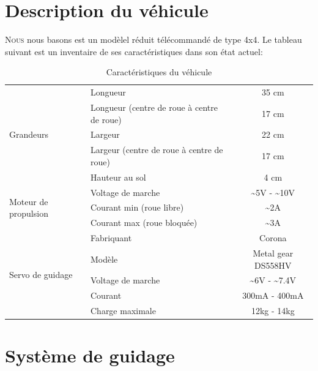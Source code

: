 \documentclass[a4paper,12pt]{report}
\begin{document}
{\section{Description du véhicule \label{TableDesc}}
\lettrine{N}{ous} nous basons est un modèlel r\'eduit
t\'el\'ecommand\'e de type 4x4. Le tableau suivant est un inventaire de 
ses caractéristiques dans son \'etat actuel:
\begin{table}[h!]
\begin{center}
  \begin{tabular}{|p{4cm}|p{4cm}|c|}
    \hline
    \multirow{5}{*}{Grandeurs}
    &Longueur & 35 cm \\ \cline{2-3}
    &Longueur (centre de roue \`a centre de roue)& 17 cm \\ \cline{2-3}
    &Largeur & 22 cm \\ \cline{2-3}
    &Largeur (centre de roue \`a centre de roue) & 17 cm \\ \cline{2-3}
    & Hauteur au sol & 4 cm\\ \hline
    \multirow{3}{*}{Moteur de propulsion}
    & Voltage de marche & \~{}5V - \~{}10V  \\ \cline{2-3}
    & Courant min (roue libre) & \~{}2A \\ \cline{2-3}
    & Courant max (roue bloqu\'ee) & \~{}3A \\ \hline
    \multirow{5}{*}{Servo de guidage}
    & Fabriquant & Corona \\ \cline{2 - 3}
    & Modèle & Metal gear DS558HV\\ \cline{2-3}
    & Voltage de marche & \~{}6V - \~{}7.4V  \\ \cline{2-3}
    & Courant & 300mA - 400mA \\ \cline{2-3}
    & Charge maximale & 12kg - 14kg \\  
 \hline
	\end{tabular}
\end{center}
\caption{Caractéristiques du véhicule}
\end{table}

\section{Système de guidage}


}
\end{document}
